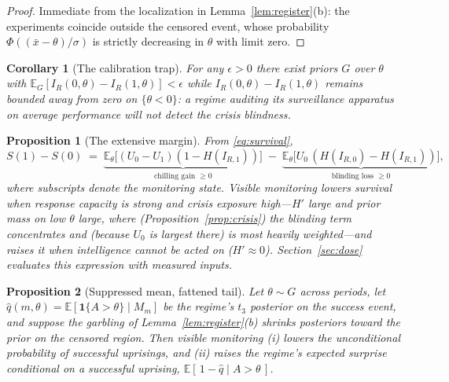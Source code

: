 \documentclass[11pt]{article}
\newtheorem{proposition}{Proposition}
\newtheorem{corollary}{Corollary}
\theoremstyle{remark}
\newcommand{\E}{\mathbb{E}}
\begin{document}
\begin{proof}
Immediate from the localization in Lemma~\ref{lem:register}(b): the experiments coincide outside the censored event, whose probability $\Phi((\bar x - \theta)/\sigma)$ is strictly decreasing in $\theta$ with limit zero.
\end{proof}

\begin{corollary}[The calibration trap]\label{cor:trap}
For any $\epsilon > 0$ there exist priors $G$ over $\theta$ with $\E_G[I_R(0,\theta) - I_R(1,\theta)] < \epsilon$ while $I_R(0,\theta) - I_R(1,\theta)$ remains bounded away from zero on $\{\theta < 0\}$: a regime auditing its surveillance apparatus on average performance will not detect the crisis blindness.
\end{corollary}

\begin{proposition}[The extensive margin]\label{prop:extensive}
From \eqref{eq:survival},
\[
S(1) - S(0) \;=\; \underbrace{\E_\theta\big[(U_0 - U_1)(1 - H(I_{R,1}))\big]}_{\text{chilling gain } \ge 0} \;-\; \underbrace{\E_\theta\big[U_0\,(H(I_{R,0}) - H(I_{R,1}))\big]}_{\text{blinding loss } \ge 0},
\]
where subscripts denote the monitoring state. Visible monitoring lowers survival when response capacity is strong and crisis exposure high---$H'$ large and prior mass on low $\theta$ large, where (Proposition~\ref{prop:crisis}) the blinding term concentrates and (because $U_0$ is largest there) is most heavily weighted---and raises it when intelligence cannot be acted on ($H' \approx 0$). Section~\ref{sec:dose} evaluates this expression with measured inputs.
\end{proposition}

\begin{proposition}[Suppressed mean, fattened tail]\label{prop:tail}
Let $\theta \sim G$ across periods, let $\hat q(m,\theta) = \E[\mathbf{1}\{A>\theta\} \mid M_m]$ be the regime's $t_3$ posterior on the success event, and suppose the garbling of Lemma~\ref{lem:register}(b) shrinks posteriors toward the prior on the censored region. Then visible monitoring (i) lowers the unconditional probability of successful uprisings, and (ii) raises the regime's expected surprise conditional on a successful uprising, $\E[\,1 - \hat q \mid A > \theta\,]$.
\end{proposition}
\end{document}
